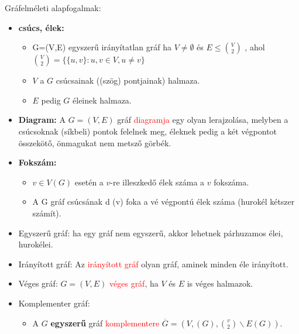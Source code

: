 \documentclass[../../szobeli.tex]{subfiles}
\begin{document}
\begin{center}
    \noindent{}
\end{center}

    Gráfelméleti alapfogalmak: 
    
    \begin{itemize}
        \item \textbf{csúcs, élek:} \begin{itemize}
            \item G=(V,E) egyszerű irányítatlan gráf ha $V \neq \emptyset$ és $E \leq \binom{V}{2}$ , ahol $\binom{V}{2} = \{\{u,v\}:u,v\in V,u\neq v\}$
            \item $V$ a $G$ csúcsainak ((szög) pontjainak) halmaza.
            \item $E$ pedig $G$ éleinek halmaza.
        \end{itemize} 
        \item \textbf{Diagram:} A $G = (V,E)$ gráf \textcolor{red}{diagramja} egy olyan lerajzolása, melyben a csúcsoknak (síkbeli) pontok felelnek meg, éleknek pedig a két végpontot összekötő, önmagukat nem metsző görbék.
        \item \textbf{Fokszám:}\begin{itemize}
            \item $v \in V(G)$  esetén a $v$-re illeszkedő élek száma a $v$ fokszáma.
            \item A G gráf csúcsának d (v) foka a vé végpontú élek száma (hurokél kétszer számít).
        \end{itemize}
        \item Egyszerű gráf: ha egy gráf nem egyszerű, akkor lehetnek párhuzamos élei, hurokélei.
        \item Irányított gráf: Az \textcolor{red}{irányított gráf} olyan gráf, aminek minden éle irányított.
        \item Véges gráf: $G = (V,E)$ \textcolor{red}{véges gráf}, ha $V$ és $E$ is véges halmazok.
        \item Komplementer gráf: \begin{itemize}
            \item A $G$ \textbf{egyszerű} gráf \textcolor{red}{komplementere} $\overline{G} = (V,(G), \binom{v}{2} \backslash E(G))$.

\end{itemize}
\end{itemize}
\end{document}
